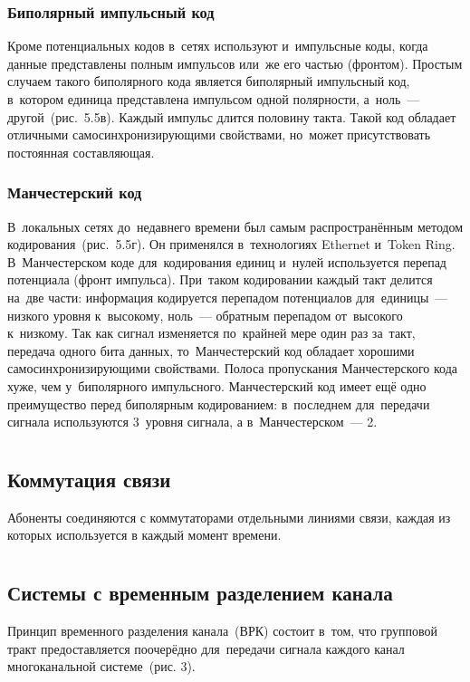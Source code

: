 \documentclass[
	a4paper,
	oneside,
	BCOR = 10mm,
	DIV = 12,
	12pt,
	headings = normal,
]{scrartcl}
\begin{document}
				\subsubsection{Биполярный импульсный код}
					Кроме потенциальных кодов в~сетях используют и~импульсные коды, когда данные представлены полным импульсов или~же его частью (фронтом). Простым случаем такого биполярного кода является биполярный импульсный код, в~котором единица представлена импульсом одной полярности, а~ноль~— другой~(рис.~5.5в). Каждый импульс длится половину такта. Такой код обладает отличными самосинхронизирующими свойствами, но~может присутствовать постоянная составляющая.

				\subsubsection{Манчестерский код}
					В~локальных сетях до~недавнего времени был самым распространённым методом кодирования~(рис.~5.5г). Он применялся в~технологиях \textenglish{Ethernet} и~\textenglish{Token Ring}. В~Манчестерском коде для~кодирования единиц и~нулей используется перепад потенциала (фронт импульса). При~таком кодировании каждый такт делится на~две части: информация кодируется перепадом потенциалов для~единицы~— низкого уровня к~высокому, ноль~— обратным перепадом от~высокого к~низкому. Так как сигнал изменяется по~крайней мере один раз за~такт, передача одного бита данных, то~Манчестерский код обладает хорошими самосинхронизирующими свойствами. Полоса пропускания Манчестерского кода хуже, чем у~биполярного импульсного. Манчестерский код имеет ещё одно преимущество перед биполярным кодированием: в~последнем для~передачи сигнала используются 3~уровня сигнала, а в~Манчестерском~— 2.

			\section{}
				\subsection{Коммутация связи}
				Абоненты соединяются с коммутаторами отдельными линиями связи, каждая из которых используется в каждый момент времени.

			\section{}
				\subsection{Системы с временным разделением канала}
					Принцип временного разделения канала~(ВРК) состоит в~том, что групповой тракт предоставляется поочерёдно для~передачи сигнала каждого канал многоканальной системе~(рис. 3).
\end{document}

